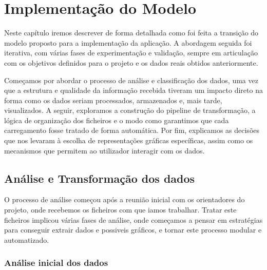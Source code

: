 

\chapter{Implementação do Modelo}
\label{ch:implementacaoDoModelo}

Neste capítulo iremos descrever de forma detalhada como foi feita a transição do modelo proposto para a implementação  da aplicação. A abordagem seguida foi iterativa, com várias fases de experimentação e validação, sempre em articulação com os objetivos definidos para o projeto e os dados reais obtidos anteriormente.

Começamos por abordar o processo de análise e classificação dos dados, uma vez que a estrutura e qualidade da informação recebida tiveram um impacto direto na forma como os dados seriam processados, armazenados e, mais tarde, visualizados. A seguir, exploramos a construção do pipeline de transformação, a lógica de organização dos ficheiros e o modo como garantimos que cada carregamento fosse tratado de forma automática. Por fim, explicamos as decisões que nos levaram à escolha de representações gráficas específicas, assim como os mecanismos que permitem ao utilizador interagir com os dados.

\section{Análise e Transformação dos dados}

O processo de análise começou após a reunião inicial com os orientadores do projeto, onde recebemos os ficheiros com que iamos trabalhar. Tratar este ficheiros implicou várias fases de análise, onde começamos a pensar em estratégias para conseguir extrair dados e possiveis gráficos, e tornar este processo modular e automatizado.

\subsection{Análise inicial dos dados}
\label{sec:analiseInicial}


